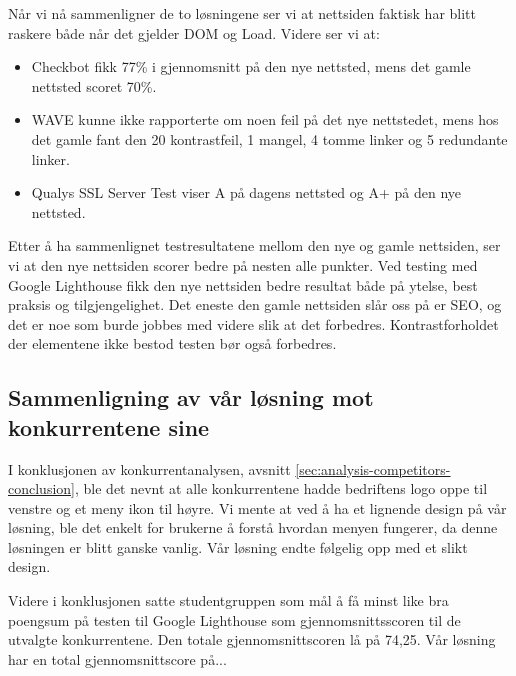 Når vi nå sammenligner de to løsningene ser vi at nettsiden faktisk har blitt raskere både når det gjelder DOM og Load. Videre ser vi at:

\begin{itemize}
\item Checkbot fikk 77\% i gjennomsnitt på den nye nettsted, mens det gamle nettsted scoret 70\%. 
\item WAVE kunne ikke rapporterte om noen feil på det nye nettstedet, mens hos det gamle fant den 20 kontrastfeil, 1 mangel, 4 tomme linker og 5 redundante linker.
\item Qualys SSL Server Test viser A på dagens nettsted og A+ på den nye nettsted.
\end{itemize}

Etter å ha sammenlignet testresultatene mellom den nye og gamle nettsiden, ser vi at den nye nettsiden scorer bedre på nesten alle punkter. Ved testing med Google Lighthouse fikk den nye nettsiden bedre resultat både på ytelse, best praksis og tilgjengelighet. Det eneste den gamle nettsiden slår oss på er SEO, og det er noe som burde jobbes med videre slik at det forbedres. Kontrastforholdet der elementene ikke bestod testen bør også forbedres.

\subsection{Sammenligning av vår løsning mot konkurrentene sine}
I konklusjonen av konkurrentanalysen, avsnitt \ref{sec:analysis-competitors-conclusion}, ble det nevnt at alle konkurrentene hadde bedriftens logo oppe til venstre og et meny ikon til høyre. Vi mente at ved å ha et lignende design på vår løsning, ble det enkelt for brukerne å forstå hvordan menyen fungerer, da denne løsningen er blitt ganske vanlig. Vår løsning endte følgelig opp med et slikt design.

Videre i konklusjonen satte studentgruppen som mål å få minst like bra poengsum på testen til Google Lighthouse som gjennomsnittsscoren til de utvalgte konkurrentene. Den totale gjennomsnittscoren lå på 74,25. Vår løsning har en total gjennomsnittscore på... 





